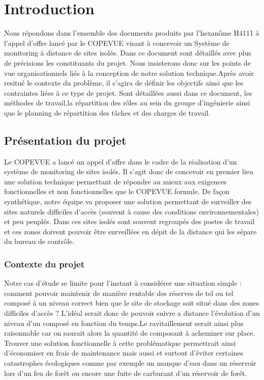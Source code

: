 \section{Introduction}
Nous répondons dans l'ensemble des documents produits par l'hexanôme H4111 à l'appel d'offre lancé par le COPEVUE visant à concevoir un Système de monitoring à distance de sites isolés. Dans ce document sont détaillés avec plus de précisions les constituants  du projet. Nous insisterons donc sur les points de vue organisationnels liés à la conception de notre solution technique.Après avoir resitué le contexte du problème, il s'agira de définir les objectifs ainsi que les contraintes liées à ce type de projet. Sont détaillées aussi dans ce document, les méthodes de travail,la répartition des rôles au sein du groupe d'ingénierie ainsi que le planning de répartition des tâches et des charges de travail. 

\subsection{Présentation du projet}
Le COPEVUE a lancé un appel d'offre dans le cadre de la réalisation d'un système de monitoring de sites isolés. Il s'agit donc de concevoir en premier lieu une solution technique permettant de répondre au mieux aux exigences fonctionnelles et non fonctionnelles que le COPEVUE formule. De façon synthétique, notre équipe va proposer une solution permettant de surveiller des sites naturels difficiles d'accès (souvent à cause des conditions environnementales) et peu peuplés. Dans ces sites isolés sont souvent regroupés des postes de travail et ces zones doivent pouvoir être surveillées en dépit de la distance qui les sépare du bureau de contrôle.

\subsubsection{Contexte du projet}
Notre cas d'étude se limite pour l'instant à considérer une situation simple : comment pouvoir maintenir de manière rentable des réserves de tel ou tel composé à un niveau correct bien que le site de stockage soit situé dans des zones difficiles d'accès ? L'idéal serait donc de pouvoir suivre a distance l'évolution d'un niveau d'un composé en fonction du temps.Le ravitaillement serait ainsi plus raisonnable car on saurait alors la quantité de composant à acheminer sur place. Trouver une solution fonctionnelle à cette problématique permettrait ainsi d'économiser en frais de maintenance mais aussi et surtout d'éviter certaines catastrophes écologiques comme par exemple un manque d'eau dans un réservoir lors d'un feu de forêt ou encore une fuite de carburant d'un réservoir de forêt.

